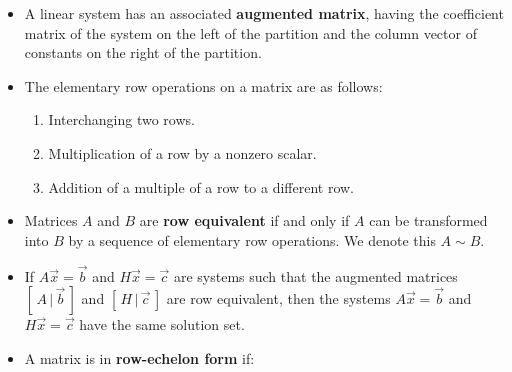 \documentclass[11pt]{amsart}
\begin{document}
\begin{itemize}

	\item{
		A linear system has an associated \textbf{augmented matrix}, having the coefficient matrix of the system on the left of the partition and
		the column vector of constants on the right of the partition.
	}
	\item{
		The elementary row operations on a matrix are as follows:
		\begin{enumerate}
			\item{Interchanging two rows.}
			\item{Multiplication of a row by a nonzero scalar.}
			\item{Addition of a multiple of a row to a different row.}
		\end{enumerate}
	}
	\item{
		Matrices $A$ and $B$ are \textbf{row equivalent} if and only if $A$ can be transformed into $B$ by a sequence of elementary row
		operations. We denote this $A \sim B$.
	}
	\item{
		If $A\vec{x} = \vec{b}$ and $H\vec{x} = \vec{c}$ are systems such that the augmented matrices $[\, A \, | \, \vec{b} \, ]$ and 
		$[ \, H  \, | \, \vec{c} \, ]$ are row equivalent, then the systems $A\vec{x} = \vec{b}$ and $H\vec{x} = \vec{c}$ have the same solution
		set.
	}
	\item{
		A matrix is in \textbf{row-echelon form} if:
		\begin{enumerate}
		

\end{enumerate}}
\end{itemize}
\end{document}
